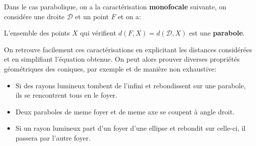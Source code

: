 Dans le cas parabolique, on a la caractérisation \textbf{monofocale} suivante, on considére une droite \(\mathcal{D}\) et un point \(F\) et on a:
\begin{center}
   L'ensemble des points \(X\) qui vérifient \(d(F, X) = d(\mathcal{D}, X)\) est une \textbf{parabole}.
\end{center}
On retrouve facilement ces caractérisations en explicitant les distances considérées et en simplifiant l'équation obtenue. On peut alors prouver diverses propriétés géométriques des coniques, par exemple et de manière non exhaustive:
\begin{itemize}
   \item Si des rayons lumineux tombent de l'infini et rebondissent sur une parabole, ils se rencontrent tous en le foyer.
   \item Deux paraboles de meme foyer et de meme axe se coupent à angle droit.
   \item Si un rayon lumineux part d'un foyer d'une ellipse et rebondit sur celle-ci, il passera par l'autre foyer.
\end{itemize}

\subsection*{}
\chapter*{} %
